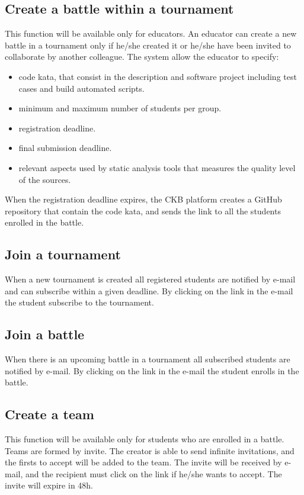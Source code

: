 \subsection{Create a battle within a tournament}
This function will be available only for educators. \newline 
An educator can create a new battle in a tournament only if he/she created it or he/she have been invited to collaborate by another colleague.
The system allow the educator to specify: 
\begin{itemize}
    \item code kata, that consist in the description and software project including test cases and build automated scripts.
    \item minimum and maximum number of students per group.
    \item registration deadline.
    \item final submission deadline.
    \item relevant aspects used by static analysis tools that measures the quality level of the sources.
\end{itemize}
When the registration deadline expires, the CKB platform creates a GitHub repository that contain the code kata, and sends the link to all the students enrolled in the battle. 

\subsection{Join a tournament}
When a new tournament is created all registered students are notified by e-mail and can subscribe within a given deadline.  By clicking on the link in the e-mail the student subscribe to the tournament.

\subsection{Join a battle}
When there is an upcoming battle in a tournament all subscribed students are notified by e-mail. By clicking on the link in the e-mail the student enrolls in the battle. 

\subsection{Create a team}
This function will be available only for students who are enrolled in a battle. \newline
Teams are formed by invite. The creator is able to send infinite invitations, and the firsts to accept will be added to the team.  \newline
The invite will be received by e-mail, and the recipient must click on the link if he/she wants to accept. The invite will expire in 48h.

